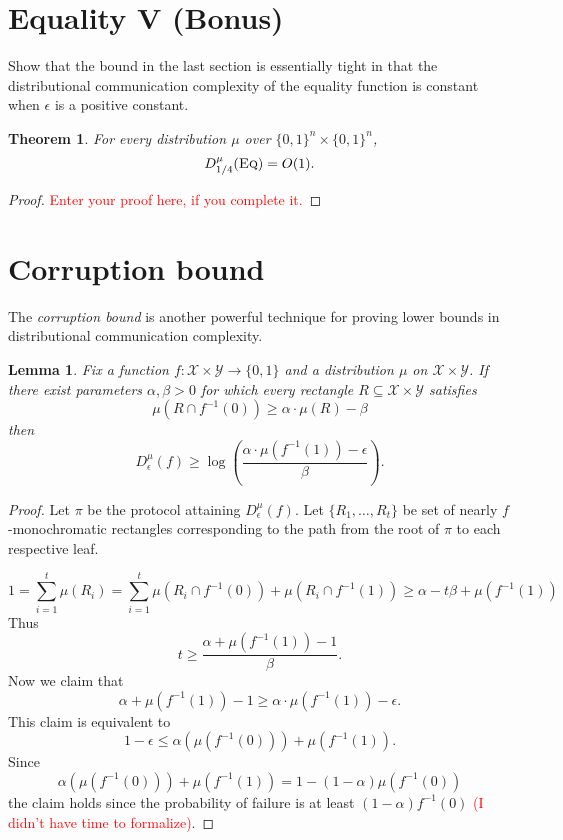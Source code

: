 \documentclass[11pt]{amsart}
\theoremstyle{plain}
\newtheorem{theorem}{Theorem}
\newtheorem{lemma}{Lemma}
\theoremstyle{definition}
\theoremstyle{plain}
\newcommand{\calX}{\mathcal{X}}
\newcommand{\calY}{\mathcal{Y}}
\newcommand{\Eq}{\textsc{Eq}}
\newcommand{\replacethistext}[1]{\textcolor{red}{#1}}
\begin{document}
\newpage \section{Equality V (Bonus)}

Show that the bound in the last section is essentially tight in that the distributional communication complexity of the equality function is constant when $\epsilon$ is a positive constant.

\begin{theorem}
For every distribution $\mu$ over $\{0,1\}^n \times \{0,1\}^n$,
\[
D^\mu_{1/4}(\Eq) = O(1).
\]
\end{theorem}

\begin{proof}
\replacethistext{Enter your proof here, if you complete it.}
\end{proof}



\newpage \section{Corruption bound}

The \emph{corruption bound} is another powerful technique for proving lower bounds in distributional communication complexity.

\begin{lemma}
Fix a function $f : \calX \times \calY \to \{0,1\}$ and a distribution
$\mu$ on $\calX \times \calY$.
If there exist parameters $\alpha, \beta > 0$ for which
every rectangle $R \subseteq \calX \times \calY$ satisfies 
\[
\mu(R \cap f^{-1}(0)) \ge \alpha \cdot \mu(R) - \beta
\]
then
\[
D^\mu_\epsilon(f) \ge \log\left( \frac{\alpha \cdot \mu(f^{-1}(1)) - \epsilon}{\beta}\right).
\]
\end{lemma}

\begin{proof}
Let $\pi$ be the protocol attaining $D_\epsilon^{\mu}(f)$.
Let $\{R_1, \dots, R_t\}$ be set of nearly $f$-monochromatic rectangles corresponding to the path from the root of $\pi$ to each respective leaf.

$$1= \sum_{i=1}^t \mu(R_i) = \sum_{i=1}^t \mu(R_i \cap f^{-1}(0)) + \mu(R_i\cap f^{-1}(1)) \geq \alpha - t \beta +\mu(f^{-1}(1))$$
Thus
$$t \geq \frac{\alpha + \mu(f^{-1}(1)) -1}{\beta}.$$
Now we claim that 
$$\alpha + \mu(f^{-1}(1)) -1 \geq \alpha\cdot \mu(f^{-1}(1)) -\epsilon.$$
This claim is equivalent to
$$1-\epsilon \leq \alpha(\mu(f^{-1}(0))) +\mu(f^{-1}(1)).$$
Since 
$$\alpha(\mu(f^{-1}(0))) +\mu(f^{-1}(1)) = 1-(1-\alpha) \mu(f^{-1}(0))$$
the claim holds since the probability of failure is at least $(1-\alpha)f^{-1}(0)$ \replacethistext{(I didn't have time to formalize)}.
\end{proof}
\end{document}
